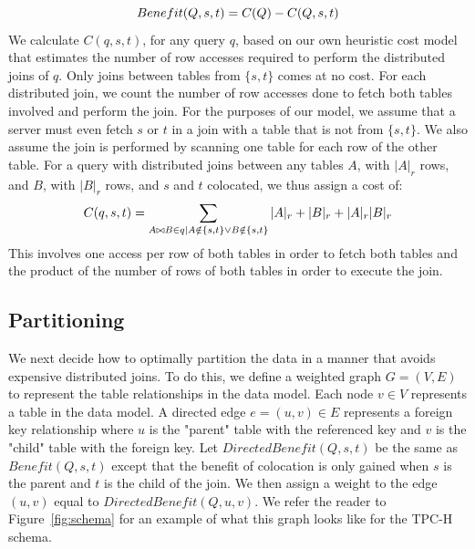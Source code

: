 \begin{equation}
Benefit(Q,s,t) = C(Q) - C(Q,s,t)
\vspace*{-8pt}
\end{equation}
We calculate $C(q,s,t)$, for any query $q$, based on our own heuristic cost model that estimates the number of row accesses required to perform the distributed joins of $q$. Only joins between tables from $\{s,t\}$ comes at no cost.  For each distributed join, we count the number of row accesses done to fetch both tables involved and perform the join.  For the purposes of our model, we assume that a server must even fetch $s$ or $t$ in a join with a table that is not from $\{s,t\}$.  We also assume the join is performed by scanning one table for each row of the other table.  For a query with distributed joins between any tables $A$, with $|A|_r$ rows, and $B$, with $|B|_r$ rows, and $s$ and $t$ colocated, we thus assign a cost of:
\vspace*{-4pt}
\begin{equation}
\label{eq:cost}
C(q,s,t) = \sum_{A\bowtie B\in q\mid A\notin \{s,t\} \lor B\notin\{s,t\}}|A|_r + |B|_r + |A|_r|B|_r
\vspace*{-4pt}
\end{equation}
\noindent This involves one access per row of both tables in order to fetch both tables and the product of the number of rows of both tables in order to execute the join.

\subsection{Partitioning}
We next decide how to optimally partition the data in a manner that avoids expensive distributed joins.  To do this, we define a weighted graph $G = (V,E)$ to represent the table relationships in the data model. Each node $v \in V$ represents a table in the data model. A directed edge $e = (u,v) \in E$ represents a foreign key relationship where $u$ is the "parent" table with the referenced key and $v$ is the "child" table with the foreign key. 
Let $DirectedBenefit(Q,s,t)$ be the same as $Benefit(Q,s,t)$ except that the benefit of colocation is only gained when $s$ is the parent and $t$ is the child of the join.  We then assign a weight to the edge $(u,v)$ equal to $DirectedBenefit(Q,u,v)$.  We refer the reader to Figure~\ref{fig:schema} for an example of what this graph looks like for the TPC-H schema.

